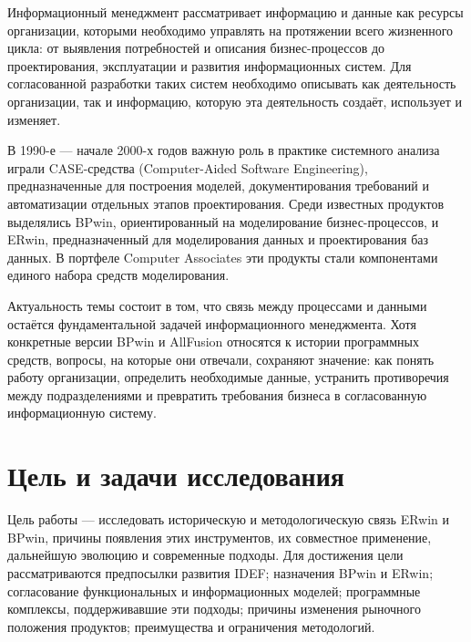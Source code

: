 \documentclass[essaypaper,paper]{pmk-graduate}
\begin{document}


\maketitlepage

\clearpage

\introduction

Информационный менеджмент рассматривает информацию и данные как ресурсы организации, которыми необходимо управлять на протяжении всего жизненного цикла: от выявления потребностей и описания бизнес-процессов до проектирования, эксплуатации и развития информационных систем. Для согласованной разработки таких систем необходимо описывать как деятельность организации, так и информацию, которую эта деятельность создаёт, использует и изменяет.

\par

В 1990-е — начале 2000-х годов важную роль в практике системного анализа играли CASE-средства (Computer-Aided Software Engineering), предназначенные для построения моделей, документирования требований и автоматизации отдельных этапов проектирования. Среди известных продуктов выделялись BPwin, ориентированный на моделирование бизнес-процессов, и ERwin, предназначенный для моделирования данных и проектирования баз данных. В портфеле Computer Associates эти продукты стали компонентами единого набора средств моделирования.

\par

Актуальность темы состоит в том, что связь между процессами и данными остаётся фундаментальной задачей информационного менеджмента. Хотя конкретные версии BPwin и AllFusion относятся к истории программных средств, вопросы, на которые они отвечали, сохраняют значение: как понять работу организации, определить необходимые данные, устранить противоречия между подразделениями и превратить требования бизнеса в согласованную информационную систему.

\par

\section{Цель и задачи исследования}

Цель работы — исследовать историческую и методологическую связь ERwin и BPwin, причины появления этих инструментов, их совместное применение, дальнейшую эволюцию и современные подходы. Для достижения цели рассматриваются предпосылки развития IDEF; назначения BPwin и ERwin; согласование функциональных и информационных моделей; программные комплексы, поддерживавшие эти подходы; причины изменения рыночного положения продуктов; преимущества и ограничения методологий.
\end{document}
